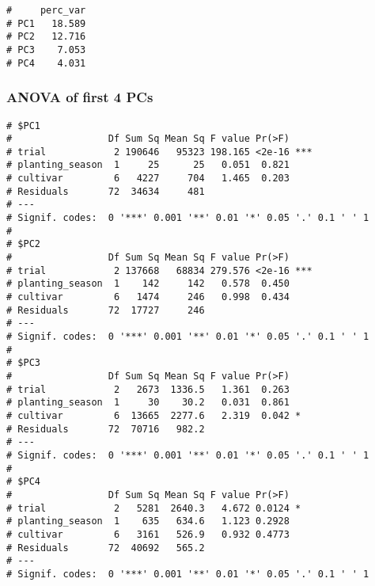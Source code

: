 \documentclass[
]{article}
\newenvironment{Shaded}{\begin{snugshade}}{\end{snugshade}}
\newcommand{\AttributeTok}[1]{\textcolor[rgb]{0.77,0.63,0.00}{#1}}
\newcommand{\ControlFlowTok}[1]{\textcolor[rgb]{0.13,0.29,0.53}{\textbf{#1}}}
\newcommand{\DecValTok}[1]{\textcolor[rgb]{0.00,0.00,0.81}{#1}}
\newcommand{\FunctionTok}[1]{\textcolor[rgb]{0.00,0.00,0.00}{#1}}
\newcommand{\NormalTok}[1]{#1}
\newcommand{\OtherTok}[1]{\textcolor[rgb]{0.56,0.35,0.01}{#1}}
\newcommand{\SpecialCharTok}[1]{\textcolor[rgb]{0.00,0.00,0.00}{#1}}
\begin{document}
\begin{verbatim}
#     perc_var
# PC1   18.589
# PC2   12.716
# PC3    7.053
# PC4    4.031
\end{verbatim}

\hypertarget{anova-of-first-4-pcs-1}{%
\subsubsection{ANOVA of first 4 PCs}\label{anova-of-first-4-pcs-1}}

\begin{Shaded}
\end{Shaded}

\begin{verbatim}
# $PC1
#                 Df Sum Sq Mean Sq F value Pr(>F)    
# trial            2 190646   95323 198.165 <2e-16 ***
# planting_season  1     25      25   0.051  0.821    
# cultivar         6   4227     704   1.465  0.203    
# Residuals       72  34634     481                   
# ---
# Signif. codes:  0 '***' 0.001 '**' 0.01 '*' 0.05 '.' 0.1 ' ' 1
# 
# $PC2
#                 Df Sum Sq Mean Sq F value Pr(>F)    
# trial            2 137668   68834 279.576 <2e-16 ***
# planting_season  1    142     142   0.578  0.450    
# cultivar         6   1474     246   0.998  0.434    
# Residuals       72  17727     246                   
# ---
# Signif. codes:  0 '***' 0.001 '**' 0.01 '*' 0.05 '.' 0.1 ' ' 1
# 
# $PC3
#                 Df Sum Sq Mean Sq F value Pr(>F)  
# trial            2   2673  1336.5   1.361  0.263  
# planting_season  1     30    30.2   0.031  0.861  
# cultivar         6  13665  2277.6   2.319  0.042 *
# Residuals       72  70716   982.2                 
# ---
# Signif. codes:  0 '***' 0.001 '**' 0.01 '*' 0.05 '.' 0.1 ' ' 1
# 
# $PC4
#                 Df Sum Sq Mean Sq F value Pr(>F)  
# trial            2   5281  2640.3   4.672 0.0124 *
# planting_season  1    635   634.6   1.123 0.2928  
# cultivar         6   3161   526.9   0.932 0.4773  
# Residuals       72  40692   565.2                 
# ---
# Signif. codes:  0 '***' 0.001 '**' 0.01 '*' 0.05 '.' 0.1 ' ' 1
\end{verbatim}
\end{document}
